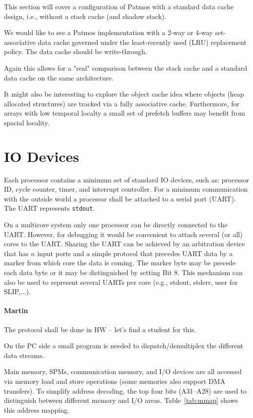 \documentclass{IEEEtran}
\newcommand{\code}[1]{{\texttt{#1}}}
\newcommand{\comment}[3]{\paragraph*{\textbf{#1}}{\color{#3}#2}}
\newcommand{\martin}[1]{\comment{Martin}{#1}{Blue}}
\begin{document}
This section will cover a configuration of Patmos with a standard data cache design, i.e., without a stack cache (and shadow stack).

We would like to see a Patmos implementation with a 2-way or 4-way set-associative data cache governed under the least-recently used (LRU) replacement policy.
The data cache should be write-through.

Again this allows for a "real" comparison between the stack cache and a standard data cache on the same architecture.

It might also be interesting to explore the object cache idea \cite{jop:ocache, jop:ocwcet:ccpe} where objects (heap allocated structures) are tracked via
a fully associative cache. Furthermore, for arrays with low temporal localty
a small set of prefetch buffers may benefit from spacial locality.

\section{IO Devices}

Each processor contains a minimum set of standard IO devices, such as:
processor ID, cycle counter, timer, and interrupt controller. For a minimum
communication with the outside world a processor shall be attached to a
serial port (UART). The UART represents \code{stdout}.

On a multicore system only one processor can be directly connected to the
UART. However, for debugging it would be convenient to attach several (or all)
cores to the UART. Sharing the UART can be achieved by an arbitration device
that has $n$ input ports and a simple protocol that precedes UART data by a
marker from which core the data is coming. The marker byte may be precede
each data byte or it may be distinguished by setting Bit 8. This mechanism can
also be used to represent several UARTs per core (e.g., stdout, stderr, user for SLIP,...).
\martin{The protocol shall be done in HW -- let's find a student for this.}

On the PC side a small program is needed to dispatch/demultiplex the different
data streams. 

Main memory, SPMs, communication memory, and I/O devices are all accessed via memory
load and store operations (some memories also support DMA transfers).
To simplify address decoding, the top four bits (A31--A28) are used to distinguish between
different memory and I/O areas. Table~\ref{tab:mmap} shows this address mapping.
\end{document}
